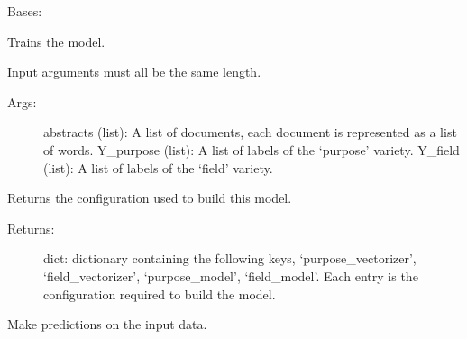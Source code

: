 \documentclass[letterpaper,10pt,english]{sphinxmanual}
\begin{document}
\begin{fulllineitems}
\label{\detokenize{KUHERD:KUHERD.Models.PurposeFieldModel}}
Bases: 

\begin{fulllineitems}
\label{\detokenize{KUHERD:KUHERD.Models.PurposeFieldModel.fit}}
Trains the model.

Input arguments must all be the same length.
\begin{description}
\item[{Args:}] \leavevmode
abstracts (list): A list of documents, each document is represented as a list of words.
Y\_purpose (list): A list of labels of the `purpose' variety.
Y\_field (list): A list of labels of the `field' variety.

\end{description}

\end{fulllineitems}


\begin{fulllineitems}
\label{\detokenize{KUHERD:KUHERD.Models.PurposeFieldModel.get_config}}
Returns the configuration used to build this model.
\begin{description}
\item[{Returns:}] \leavevmode
dict: dictionary containing the following keys, `purpose\_vectorizer', `field\_vectorizer', `purpose\_model', `field\_model'. Each entry is the configuration required to build the model.

\end{description}

\end{fulllineitems}


\begin{fulllineitems}
\label{\detokenize{KUHERD:KUHERD.Models.PurposeFieldModel.predict}}
Make predictions on the input data.


\end{fulllineitems}
\end{fulllineitems}
\end{document}
